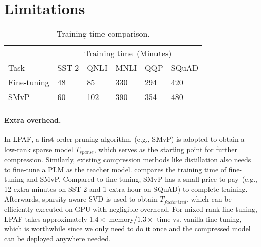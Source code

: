 \section*{Limitations}
\begin{table}[th]
	\centering
	\scriptsize
	\begin{tabular}{l|lllll}
		\toprule
		\multicolumn{1}{l|}{} & \multicolumn{5}{c}{Training time~(Minutes)}                  \\
		Task & SST-2   & QNLI     & MNLI     & QQP      & SQuAD    \\
		\midrule
		Fine-tuning           & 48  & 85   & 330  & 294  & 420  \\
		SMvP                  & 60  & 102  & 390  & 354  & 480  \\
		\bottomrule
	\end{tabular}
	\caption{Training time comparison.}
	\label{table:timecost}
\end{table}
\paragraph{Extra overhead.} In LPAF, a first-order pruning algorithm~(e.g., SMvP) is adopted to obtain a low-rank sparse model $T_{sparse}$, which serves as the starting point for further compression. Similarly, existing compression methods like distillation also needs to  fine-tune a PLM as the teacher model.  compares the training time of fine-tuning and SMvP. 
Compared to fine-tuning, SMvP has a small price to pay~(e.g., 12 extra minutes on SST-2 and 
1 extra hour on SQuAD) to complete training. Afterwards, sparsity-aware SVD is used to obtain $T_{factorized}$, which can be efficiently executed on GPU with negligible overhead. For  mixed-rank fine-tuning, LPAF takes approximately $1.4\times$ memory/$1.3\times$ time vs. vanilla fine-tuning, which is worthwhile since we only need to do it once and the compressed model can be deployed anywhere needed.
